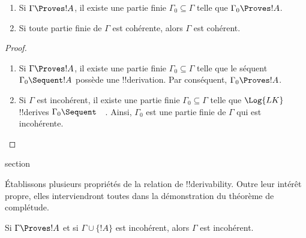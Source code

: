 \documentclass[11pt,a4paper,openany]{memoir}
\begin{document}
\begin{prop}[Compacité]
  \begin{enumerate}
  \item Si $\Gamma \Proves !A$, il existe une partie finie
    $\Gamma_0 \subseteq \Gamma$ telle que $\Gamma_0 \Proves !A$.
  \item Si toute partie finie de $\Gamma$ est cohérente,
    alors $\Gamma$ est cohérent.
  \end{enumerate}
\end{prop}

\begin{proof}
  \begin{enumerate}
  \item Si $\Gamma \Proves !A$, il existe une partie finie
    $\Gamma_0 \subseteq \Gamma$ telle que le séquent
    $\Gamma_0 \Sequent !A$ possède une !!{derivation}.
    Par conséquent, $\Gamma_0 \Proves !A$.
  \item Si $\Gamma$ est incohérent, il existe une partie finie
    $\Gamma_0 \subseteq \Gamma$ telle que $\Log{LK}$
    !!{derive}s $\Gamma_0 \Sequent \quad$. Ainsi, $\Gamma_0$
    est une partie finie de $\Gamma$ qui est incohérente.
  \end{enumerate}
\end{proof}


\endgroup



\begingroup
\expandafter\def\csname ol@sectioncs\endcsname{section}
\def\olfilename{provability-consistency}


      {}
      {}


Établissons plusieurs propriétés de la relation de !!{derivability}.
Outre leur intérêt propre, elles interviendront toutes dans la
démonstration du théorème de complétude.

\begin{prop}
Si $\Gamma \Proves !A$ et si $\Gamma \cup \{!A\}$ est incohérent,
alors $\Gamma$ est incohérent.
\end{prop}
\end{document}
